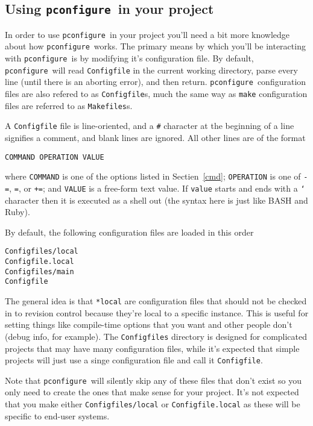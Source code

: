 \documentclass{article}
\newcommand{\pconfigure}{\texttt{pconfigure}}
\begin{document}
\subsection{Using \pconfigure\ in your project}

In order to use \pconfigure\ in your project you'll need a bit more
knowledge about how \pconfigure\ works.  The primary means by which
you'll be interacting with \pconfigure\ is by modifying it's
configuration file.  By default, \pconfigure\ will read
\texttt{Configfile} in the current working directory, parse every line
(until there is an aborting error), and then return.
\pconfigure\ configuration files are also refered to as
\texttt{Configfile}s, much the same way as \texttt{make} configuration
files are referred to as \texttt{Makefiles}s.

A \texttt{Configfile} file is line-oriented, and a \texttt{\#}
character at the beginning of a line signifies a comment, and blank
lines are ignored.  All other lines are of the format
\begin{verbatim}
COMMAND OPERATION VALUE
\end{verbatim}
where \texttt{COMMAND} is one of the options listed in
Sectien~\ref{cmd}; \texttt{OPERATION} is one of \texttt{-=},
\texttt{=}, or \texttt{+=}; and \texttt{VALUE} is a free-form text
value.  If \texttt{value} starts and ends with a \texttt{`} character
then it is executed as a shell out (the syntax here is just like BASH
and Ruby).

By default, the following configuration files are loaded in this order
\begin{verbatim}
Configfiles/local
Configfile.local
Configfiles/main
Configfile
\end{verbatim}
The general idea is that \texttt{*local} are configuration files that
should not be checked in to revision control because they're local to
a specific instance.  This is useful for setting things like
compile-time options that you want and other people don't (debug info,
for example).  The \texttt{Configfiles} directory is designed for
complicated projects that may have many configuration files, while
it's expected that simple projects will just use a singe configuration
file and call it \texttt{Configfile}.

Note that \pconfigure\ will silently skip any of these files that
don't exist so you only need to create the ones that make sense for
your project.  It's not expected that you make either
\texttt{Configfiles/local} or \texttt{Configfile.local} as these will
be specific to end-user systems.
\end{document}
